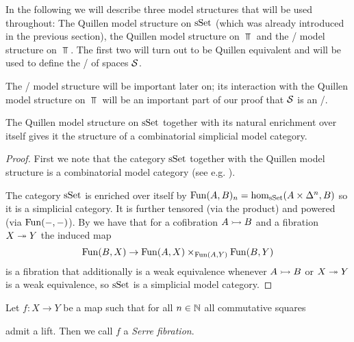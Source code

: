 In the following we will describe three model structures that will be used throughout: 
The Quillen model structure on $\operatorname{sSet}$ (which was already introduced in the previous section), the Quillen model structure on $\Top$ and the \Strom/ model structure on $\Top$.
The first two will turn out to be Quillen equivalent and will be used to define the \inftycat/ of spaces $\mathcal{S}$.

The \Strom/ model structure will be important later on; its interaction with the Quillen model structure on $\Top$ will be an important part of our proof that $\mathcal{S}$ is an \inftytop/.
\begin{prop}\label{prop:sSetCombSimpModelStructure}
    The Quillen model structure on $\operatorname{sSet}$ together with its natural enrichment over itself gives it the structure of a combinatorial simplicial model category.
    \begin{proof}
        First we note that the category $\operatorname{sSet}$ together with the Quillen model structure is a combinatorial model category (see e.g. \cite[Remark 7.11.15]{cisinski_2019}).
        
        The category $\operatorname{sSet}$ is enriched over itself by $\operatorname{Fun}(A,B)_n=\hom_{\operatorname{sSet}}(A\times\Delta^n,B)$ so it is a simplicial category.
        It is further tensored (via the product) and powered (via $\operatorname{Fun}(-,-)$).
        By \cite[Corollary 1.4.5.6, Theorem 3.1.3.1 and Theorem 3.1.3.5]{kerodon} we have that for a cofibration $A\xtailrightarrow{} B$ and a fibration $X\xtwoheadrightarrow{} Y$ the induced map 
        \begin{equation*}
            \operatorname{Fun}(B,X)\to\operatorname{Fun}(A,X)\times_{\operatorname{Fun}(A,Y)}\operatorname{Fun}(B,Y)
        \end{equation*}
        is a fibration that additionally is a weak equivalence whenever $A\xtailrightarrow{} B$ or $X\xtwoheadrightarrow{} Y$ is a weak equivalence, so $\operatorname{sSet}$ is a simplicial model category.
    \end{proof}
\end{prop}
\begin{definition}
    Let $f\colon X\to Y$ be a map such that for all $n\in\mathbb{N}$ all commutative squares
    \begin{center}
    \end{center}
    admit a lift. 
    Then we call $f$ a \emph{Serre fibration}.
\end{definition}
